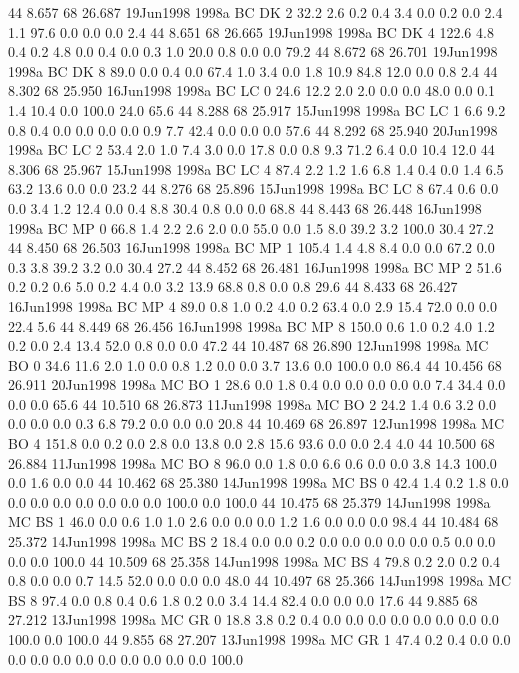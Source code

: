44 8.657	68 26.687	19Jun1998	1998a	BC	DK	2	32.2	2.6	0.2	0.4	3.4	0.0	0.2	0.0	2.4	1.1	97.6	0.0	0.0	0.0	2.4
44 8.651	68 26.665	19Jun1998	1998a	BC	DK	4	122.6	4.8	0.4	0.2	4.8	0.0	0.4	0.0	0.3	1.0	20.0	0.8	0.0	0.0	79.2
44 8.672	68 26.701	19Jun1998	1998a	BC	DK	8	89.0	0.0	0.4	0.0	67.4	1.0	3.4	0.0	1.8	10.9	84.8	12.0	0.0	0.8	2.4
44 8.302	68 25.950	16Jun1998	1998a	BC	LC	0	24.6	12.2	2.0	2.0	0.0	0.0	48.0	0.0	0.1	1.4	10.4	0.0	100.0	24.0	65.6
44 8.288	68 25.917	15Jun1998	1998a	BC	LC	1	6.6	9.2	0.8	0.4	0.0	0.0	0.0	0.0	0.9	7.7	42.4	0.0	0.0	0.0	57.6
44 8.292	68 25.940	20Jun1998	1998a	BC	LC	2	53.4	2.0	1.0	7.4	3.0	0.0	17.8	0.0	0.8	9.3	71.2	6.4	0.0	10.4	12.0
44 8.306	68 25.967	15Jun1998	1998a	BC	LC	4	87.4	2.2	1.2	1.6	6.8	1.4	0.4	0.0	1.4	6.5	63.2	13.6	0.0	0.0	23.2
44 8.276	68 25.896	15Jun1998	1998a	BC	LC	8	67.4	0.6	0.0	0.0	3.4	1.2	12.4	0.0	0.4	8.8	30.4	0.8	0.0	0.0	68.8
44 8.443	68 26.448	16Jun1998	1998a	BC	MP	0	66.8	1.4	2.2	2.6	2.0	0.0	55.0	0.0	1.5	8.0	39.2	3.2	100.0	30.4	27.2
44 8.450	68 26.503	16Jun1998	1998a	BC	MP	1	105.4	1.4	4.8	8.4	0.0	0.0	67.2	0.0	0.3	3.8	39.2	3.2	0.0	30.4	27.2
44 8.452	68 26.481	16Jun1998	1998a	BC	MP	2	51.6	0.2	0.2	0.6	5.0	0.2	4.4	0.0	3.2	13.9	68.8	0.8	0.0	0.8	29.6
44 8.433	68 26.427	16Jun1998	1998a	BC	MP	4	89.0	0.8	1.0	0.2	4.0	0.2	63.4	0.0	2.9	15.4	72.0	0.0	0.0	22.4	5.6
44 8.449	68 26.456	16Jun1998	1998a	BC	MP	8	150.0	0.6	1.0	0.2	4.0	1.2	0.2	0.0	2.4	13.4	52.0	0.8	0.0	0.0	47.2
44 10.487	68 26.890	12Jun1998	1998a	MC	BO	0	34.6	11.6	2.0	1.0	0.0	0.8	1.2	0.0	0.0	3.7	13.6	0.0	100.0	0.0	86.4
44 10.456	68 26.911	20Jun1998	1998a	MC	BO	1	28.6	0.0	1.8	0.4	0.0	0.0	0.0	0.0	0.0	7.4	34.4	0.0	0.0	0.0	65.6
44 10.510	68 26.873	11Jun1998	1998a	MC	BO	2	24.2	1.4	0.6	3.2	0.0	0.0	0.0	0.0	0.3	6.8	79.2	0.0	0.0	0.0	20.8
44 10.469	68 26.897	12Jun1998	1998a	MC	BO	4	151.8	0.0	0.2	0.0	2.8	0.0	13.8	0.0	2.8	15.6	93.6	0.0	0.0	2.4	4.0
44 10.500	68 26.884	11Jun1998	1998a	MC	BO	8	96.0	0.0	1.8	0.0	6.6	0.6	0.0	0.0	3.8	14.3	100.0	0.0	1.6	0.0	0.0
44 10.462	68 25.380	14Jun1998	1998a	MC	BS	0	42.4	1.4	0.2	1.8	0.0	0.0	0.0	0.0	0.0	0.0	0.0	0.0	100.0	0.0	100.0
44 10.475	68 25.379	14Jun1998	1998a	MC	BS	1	46.0	0.0	0.6	1.0	1.0	2.6	0.0	0.0	0.0	1.2	1.6	0.0	0.0	0.0	98.4
44 10.484	68 25.372	14Jun1998	1998a	MC	BS	2	18.4	0.0	0.0	0.2	0.0	0.0	0.0	0.0	0.0	0.5	0.0	0.0	0.0	0.0	100.0
44 10.509	68 25.358	14Jun1998	1998a	MC	BS	4	79.8	0.2	2.0	0.2	0.4	0.8	0.0	0.0	0.7	14.5	52.0	0.0	0.0	0.0	48.0
44 10.497	68 25.366	14Jun1998	1998a	MC	BS	8	97.4	0.0	0.8	0.4	0.6	1.8	0.2	0.0	3.4	14.4	82.4	0.0	0.0	0.0	17.6
44 9.885	68 27.212	13Jun1998	1998a	MC	GR	0	18.8	3.8	0.2	0.4	0.0	0.0	0.0	0.0	0.0	0.0	0.0	0.0	100.0	0.0	100.0
44 9.855	68 27.207	13Jun1998	1998a	MC	GR	1	47.4	0.2	0.4	0.0	0.0	0.0	0.0	0.0	0.0	0.0	0.0	0.0	0.0	0.0	100.0
